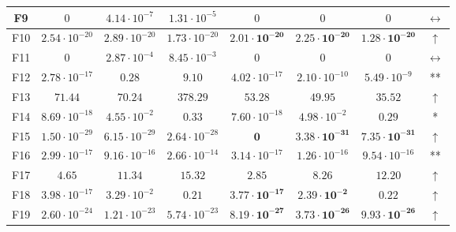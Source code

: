 \begin{table}[!t]
\begin{scriptsize}
\begin{tabular}{c || c c c | c c c c}
F9  & $0$                    & $4.14 \cdot 10^{-7}$  & $1.31 \cdot 10^{-5}$  & $0$                            & $0$                            & $0$                            & $\leftrightarrow$\\ \hline
F10 & $2.54 \cdot 10^{-20}$  & $2.89 \cdot 10^{-20}$ & $1.73 \cdot 10^{-20}$ & $\mathbf{2.01 \cdot 10^{-20}}$ & $\mathbf{2.25 \cdot 10^{-20}}$ & $\mathbf{1.28 \cdot 10^{-20}}$ & $\uparrow$ \\ \hline
F11 & $0$                    & $2.87 \cdot 10^{-4}$  & $8.45 \cdot 10^{-3}$  & $0$                            & $0$                            & $0$                            & $\leftrightarrow$\\ \hline
F12 & $2.78 \cdot 10^{-17}$  & $0.28$                & $9.10$                & $4.02 \cdot 10^{-17}$          & $2.10 \cdot 10^{-10}$          & $5.49 \cdot 10^{-9}$           & **          \\ \hline
F13 & $71.44$                & $70.24$               & $378.29$              & $\mathbf{53.28}$               & $\mathbf{49.95}$               & $\mathbf{35.52}$               & $\uparrow$ \\ \hline
F14 & $8.69 \cdot 10^{-18}$  & $4.55 \cdot 10^{-2}$  & $0.33$                & ${7.60 \cdot 10^{-18}}$        & ${4.98 \cdot 10^{-2}}$         & ${0.29}$                       & *          \\ \hline
F15 & $1.50 \cdot 10^{-29}$  & $6.15 \cdot 10^{-29}$ & $2.64 \cdot 10^{-28}$ & $\mathbf{0}$                   & $\mathbf{3.38 \cdot 10^{-31}}$ & $\mathbf{7.35 \cdot 10^{-31}}$ & $\uparrow$ \\ \hline
F16 & $2.99 \cdot 10^{-17}$  & $9.16 \cdot 10^{-16}$ & $2.66 \cdot 10^{-14}$ & ${3.14 \cdot 10^{-17}}$        & ${1.26 \cdot 10^{-16}}$        & ${9.54 \cdot 10^{-16}}$        & **          \\ \hline
F17 & $4.65$                 & $11.34$               & $15.32$               & $\mathbf{2.85}$                & $\mathbf{8.26}$                & $\mathbf{12.20}$               & $\uparrow$ \\ \hline
F18 & $3.98 \cdot 10^{-17}$  & $3.29 \cdot 10^{-2}$  & $0.21$                & $\mathbf{3.77 \cdot 10^{-17}}$ & $\mathbf{2.39 \cdot 10^{-2}}$  & $\mathbf{0.22}$                & $\uparrow$ \\ \hline
F19 & $2.60 \cdot 10^{-24}$  & $1.21 \cdot 10^{-23}$ & $5.74 \cdot 10^{-23}$ & $\mathbf{8.19 \cdot 10^{-27}}$ & $\mathbf{3.73 \cdot 10^{-26}}$ & $\mathbf{9.93 \cdot 10^{-26}}$ & $\uparrow$ \\ \hline
\end{tabular}
\end{scriptsize}
\end{table}
